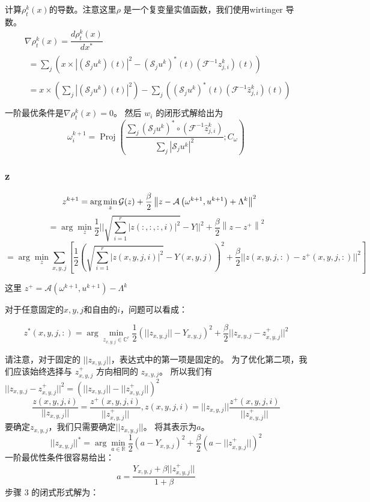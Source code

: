 \documentclass[12pt]{article}
\begin{document}
计算$\rho_{t}^{k}(x)$的导数。注意这里$\rho$ 是一个复变量实值函数，我们使用wirtinger 导数。 
$$
\begin{aligned}
&\nabla \rho_{t}^{k}(x) = \dfrac{ d\rho_{t}^{k}(x)}{dx^*} \\
&\begin{aligned}
=\sum_{j}\left(x \times\left|\left(\mathcal{S}_{j} u^{k}\right)(t)\right|^{2}-\left(\mathcal{S}_{j} u^{k}\right)^{*}(t)\left(\mathcal{F}^{-1} \hat{z}_{j,i}^{k}\right)(t)\right)
\end{aligned} \\
&\begin{aligned}
=x \times\left(\sum_{j}\left|\left(\mathcal{S}_{j} u^{k}\right)(t)\right|^{2}\right)-\sum_{j}\left(\left(\mathcal{S}_{j} u^{k}\right)^{*}(t)\left(\mathcal{F}^{-1} \hat{z}_{j,i}^{k}\right)(t)\right) \\
\end{aligned}
\end{aligned}
$$
一阶最优条件是$\nabla \rho_{t}^{k}(x)=0 $。 然后 $w_i$ 的闭形式解给出为
$$
\omega_i^{k+1}=\operatorname{Proj}\left(\frac{ \sum_{j}\left(\mathcal{S}_{j} u^{k}\right)^{*} \circ\left(\mathcal{F}^{-1} \hat{z}_{j,i}^{k}\right)}{ \sum_{j}\left|\mathcal{S}_{j} u^{k}\right|^{2}} ; C_{\omega}\right)
$$

\subsubsection{z}
$$
\quad z^{k+1}=\arg \min _{z} \mathcal{G}(z)+\frac{\beta}{2}\left\|z-\mathcal{A}\left(\omega^{k+1}, u^{k+1}\right)+\Lambda^{k}\right\|^{2}\\
$$
$$
=\arg \min _{z} \frac{1}{2}|| \sqrt{ \sum_{i=1}^{r} |z(:,:,:,i)|^2} - Y||^2+\frac{\beta}{2}\left\|z - z^+\right\|^{2}
$$
$$
= \arg \min _{z} \sum_{x,y,j} [\frac{1}{2} ( \sqrt{ \sum_{i=1}^{r} |z(x,y,j,i)|^2} - Y(x,y,j) )^2 +
\frac{\beta}{2}||z(x,y,j,:) - z^+(x,y,j,:)||^2 ]
$$

这里 $z^+ = \mathcal{A}\left(\omega^{k+1}, u^{k+1}\right) - \Lambda^{k}$

对于任意固定的$x,y,j$和自由的$i$，问题可以看成：

$$
z^*(x,y,j,:) = \arg \min_{z_{x,y,j} \in \mathbb{C}^{r}} \frac{1}{2} ( ||z_{x,y,j}|| - Y_{x,y,j} )^2
+ \frac{\beta}{2} ||z_{x,y,j} - z_{x,y,j}^+||^2
$$

请注意，对于固定的 $||z_{x,y,j}||$，表达式中的第一项是固定的。 为了优化第二项，我们应该始终选择与 $z_{x,y,j}^+$ 方向相同的 $z_{x,y,j}$。 所以我们有 $||z_{x,y,j} - z_{x,y,j}^+||^2 = (||z_{x,y,j}|| - ||z_{x, y,j}^+||)^2$
$$
\dfrac{z(x,y,j,i)}{||z_{x,y,j}||} = \dfrac{z^+(x,y,j,i)}{||z_{x,y,j}^+||}, z(x,y,j,i) = ||z_{x,y,j}||\dfrac{z^+(x,y,j,i)}{||z_{x,y,j}^+||}
$$
要确定$z_{x,y,j}$，我们只需要确定$||z_{x,y,j}||$。 将其表示为$a$。
$$
||z_{x,y,j}||^* = \arg \min_{a \in \mathbb{R}} \frac{1}{2}(a - Y_{x,y,j})^2 + \dfrac{\beta}{2}
(a - ||z_{x,y,j}^+||)^2
$$
一阶最优性条件很容易给出：
$$
a = \dfrac{Y_{x,y,j} + \beta ||z_{x,y,j}^+||}{1 + \beta}
$$
步骤 3 的闭式形式解为：
\end{document}
